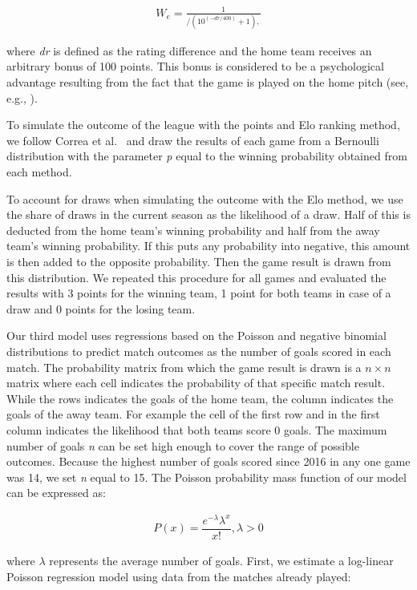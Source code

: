 \documentclass[12pt,a4paper]{article}
\begin{document}
\begin{align}
W_e = \frac{1}{/(10^{(-dr/400)}+1),}
\end{align}

where \emph{dr} is defined as the rating difference and the home team
receives an arbitrary bonus of 100 points. This bonus is considered to
be a psychological advantage resulting from the fact that the game is
played on the home pitch (see, e.g., \textcite{Pollard2008}).

To simulate the outcome of the league with the points and Elo ranking
method, we follow Correa et al.~\autocite*{correa} and draw the results
of each game from a Bernoulli distribution with the parameter \emph{p}
equal to the winning probability obtained from each method.

To account for draws when simulating the outcome with the Elo method, we
use the share of draws in the current season as the likelihood of a
draw. Half of this is deducted from the home team's winning probability
and half from the away team's winning probability. If this puts any
probability into negative, this amount is then added to the opposite
probability. Then the game result is drawn from this distribution. We
repeated this procedure for all games and evaluated the results with 3
points for the winning team, 1 point for both teams in case of a draw
and 0 points for the losing team.

Our third model uses regressions based on the Poisson and negative
binomial distributions to predict match outcomes as the number of goals
scored in each match. The probability matrix from which the game result
is drawn is a \(n \times n\) matrix where each cell indicates the
probability of that specific match result. While the rows indicates the
goals of the home team, the column indicates the goals of the away team.
For example the cell of the first row and in the first column indicates
the likelihood that both teams score \(0\) goals. The maximum number of
goals \emph{n} can be set high enough to cover the range of possible
outcomes. Because the highest number of goals scored since 2016 in any
one game was 14, we set \emph{n} equal to 15. The Poisson probability
mass function of our model can be expressed as:

\begin{align}
P(x) = \dfrac{e^{-\lambda}\lambda^x}{x!}, \lambda > 0
\end{align}

where \(\lambda\) represents the average number of goals. First, we
estimate a log-linear Poisson regression model using data from the
matches already played:
\end{document}
